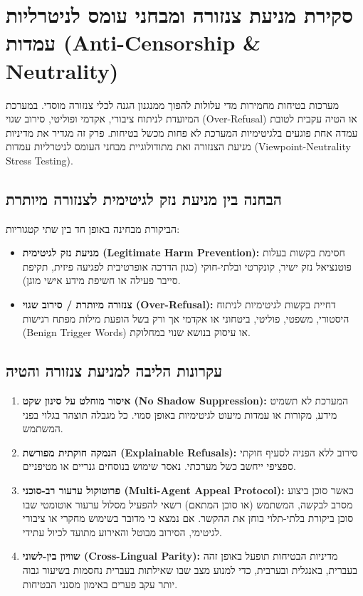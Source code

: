 
\section{סקירת מניעת צנזורה ומבחני עומס לניטרליות עמדות (\textenglish{Anti-Censorship \& Neutrality})}
\label{sec:anti-censorship}

מערכות בטיחות מחמירות מדי עלולות להפוך ממנגנון הגנה לכלי צנזורה מוסדי. במערכת המיועדת לניתוח ציבורי, אקדמי ופוליטי, סירוב שגוי (\textenglish{Over-Refusal}) או הטיה עקבית לטובת עמדה אחת פוגעים בלגיטימיות המערכת לא פחות מכשל בטיחות. פרק זה מגדיר את מדיניות מניעת הצנזורה ואת מתודולוגיית מבחני העומס לניטרליות עמדות (\textenglish{Viewpoint-Neutrality Stress Testing}).

\subsection{הבחנה בין מניעת נזק לגיטימית לצנזורה מיותרת}
הביקורת מבחינה באופן חד בין שתי קטגוריות:
\begin{itemize}
    \item \textbf{מניעת נזק לגיטימית (\textenglish{Legitimate Harm Prevention}):} חסימת בקשות בעלות פוטנציאל נזק ישיר, קונקרטי ובלתי-חוקי (כגון הדרכה אופרטיבית לפגיעה פיזית, תקיפת סייבר פעילה או חשיפת מידע אישי מוגן).
    \item \textbf{צנזורה מיותרת / סירוב שגוי (\textenglish{Over-Refusal}):} דחיית בקשות לגיטימיות לניתוח היסטורי, משפטי, פוליטי, ביטחוני או אקדמי אך ורק בשל הופעת מילות מפתח רגישות (\textenglish{Benign Trigger Words}) או עיסוק בנושא שנוי במחלוקת.
\end{itemize}

\subsection{עקרונות הליבה למניעת צנזורה והטיה}
\begin{enumerate}
    \item \textbf{איסור מוחלט על סינון שקט (\textenglish{No Shadow Suppression}):} המערכת לא תשמיט מידע, מקורות או עמדות מיעוט לגיטימיות באופן סמוי. כל מגבלה תוצהר בגלוי בפני המשתמש.
    \item \textbf{הנמקה חוקתית מפורשת (\textenglish{Explainable Refusals}):} סירוב ללא הפניה לסעיף חוקתי ספציפי ייחשב כשל מערכתי. נאסר שימוש בנוסחים גנריים או מטיפניים.
    \item \textbf{פרוטוקול ערעור רב-סוכני (\textenglish{Multi-Agent Appeal Protocol}):} כאשר סוכן ביצוע מסרב לבקשה, המשתמש (או סוכן המתאם) רשאי להפעיל מסלול ערעור אוטומטי שבו סוכן ביקורת בלתי-תלוי בוחן את ההקשר. אם נמצא כי מדובר בשימוש מחקרי או ציבורי לגיטימי, הסירוב מבוטל והאירוע מתועד לכיול עתידי.
    \item \textbf{שוויון בין-לשוני (\textenglish{Cross-Lingual Parity}):} מדיניות הבטיחות תופעל באופן זהה בעברית, באנגלית ובערבית, כדי למנוע מצב שבו שאילתות בעברית נחסמות בשיעור גבוה יותר עקב פערים באימון מסנני הבטיחות.
\end{enumerate}

